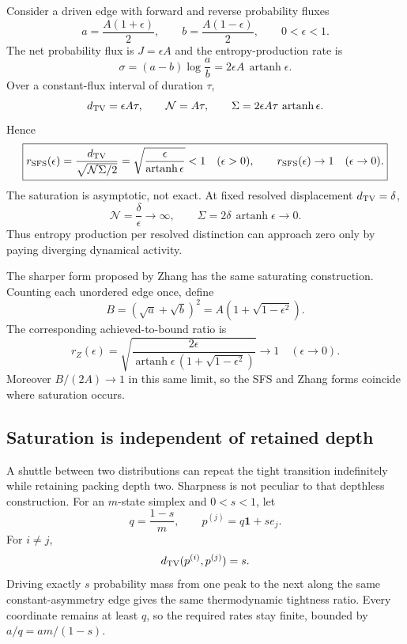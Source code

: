\documentclass[11pt,a4paper]{article}
\theoremstyle{definition}
\numberwithin{equation}{section}
\begin{document}
Consider a driven edge with forward and reverse probability fluxes
\[
a=\frac{A(1+\epsilon)}2,
\qquad
b=\frac{A(1-\epsilon)}2,
\qquad
0<\epsilon<1.
\]
The net probability flux is $J=\epsilon A$ and the entropy-production rate is
\[
\sigma
=
(a-b)\log\frac ab
=
2\epsilon A\,\operatorname{artanh}\epsilon.
\]
Over a constant-flux interval of duration $\tau$,
\[
d_{\rm TV}=\epsilon A\tau,
\qquad
\mathcal N=A\tau,
\qquad
\Sigma=
2\epsilon A\tau\,\operatorname{artanh}\epsilon.
\]
Hence
\begin{equation}
\boxed{
r_{\rm SFS}(\epsilon)
=
\frac{d_{\rm TV}}{\sqrt{\mathcal N\Sigma/2}}
=
\sqrt{\frac{\epsilon}{\operatorname{artanh}\epsilon}}
<1
\quad(\epsilon>0),
\qquad
r_{\rm SFS}(\epsilon)\to1
\quad(\epsilon\to0).
}
\label{eq:sfs-tightness}
\end{equation}
The saturation is asymptotic, not exact. At fixed resolved displacement
$d_{\rm TV}=\delta$,
\[
\mathcal N=\frac{\delta}{\epsilon}\to\infty,
\qquad
\Sigma=2\delta\,\operatorname{artanh}\epsilon\to0.
\]
Thus entropy production per resolved distinction can approach zero only by
paying diverging dynamical activity.

The sharper form proposed by Zhang \cite{Zhang2018Comment} has the same
saturating construction. Counting each unordered edge once, define
\[
B=
\left(\sqrt a+\sqrt b\right)^2
=
A\left(1+\sqrt{1-\epsilon^2}\right).
\]
The corresponding achieved-to-bound ratio is
\begin{equation}
\boxed{
r_Z(\epsilon)
=
\sqrt{
\frac{2\epsilon}
{\operatorname{artanh}\epsilon\,
\left(1+\sqrt{1-\epsilon^2}\right)}
}
\longrightarrow1
\quad(\epsilon\to0).
}
\label{eq:zhang-tightness}
\end{equation}
Moreover $B/(2A)\to1$ in this same limit, so the SFS and Zhang forms coincide
where saturation occurs.

\subsection*{Saturation is independent of retained depth}

A shuttle between two distributions can repeat the tight transition
indefinitely while retaining packing depth two. Sharpness is not peculiar to
that depthless construction. For an $m$-state simplex and $0<s<1$, let
\[
q=\frac{1-s}{m},
\qquad
p^{(j)}=q\mathbf 1+s e_j.
\]
For $i\ne j$,
\[
d_{\rm TV}(p^{(i)},p^{(j)})=s.
\]
Driving exactly $s$ probability mass from one peak to the next along the same
constant-asymmetry edge gives the same thermodynamic tightness ratio. Every
coordinate remains at least $q$, so the required rates stay finite, bounded by
$a/q=a m/(1-s)$.
\end{document}

